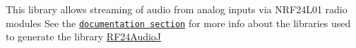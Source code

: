 This library allows streaming of audio from analog inputs via N\-R\-F24\-L01 radio modules See the \href{http://tmrh20.github.io/}{\tt documentation section} for more info about the libraries used to generate the library \hyperlink{class_r_f24_audio_j}{R\-F24\-Audio\-J} 